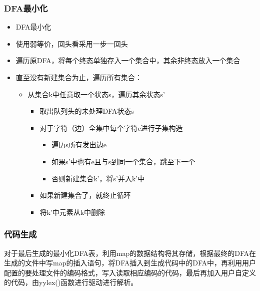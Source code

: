 \subsubsection{DFA最小化}
\begin{itemize}
    \item DFA最小化
    \item 使用弱等价，回头看采用一步一回头
    \item 遍历原DFA，将每个终态单独存入一个集合中，其余非终态放入一个集合
    \item 直至没有新建集合为止，遍历所有集合：
    \begin{itemize}
        \item 从集合k中任意取一个状态s，遍历其余状态s’
        \begin{itemize}
            \item 取出队列头的未处理DFA状态s
            \item 对于字符（边）全集中每个字符c进行子集构造
            \begin{itemize}
                \item 遍历s所有发出边e
                \item 如果s’中也有e且与s到同一个集合，跳至下一个
                \item 否则新建集合k’，将s’并入k’中
            \end{itemize}
            \item 如果新建集合了，就终止循环
            \item 将k’中元素从k中删除
        \end{itemize}
    \end{itemize}
\end{itemize}
\subsubsection{代码生成}
对于最后生成的最小化DFA表，利用map的数据结构将其存储，根据最终的DFA在生成的文件中写map的插入语句，将DFA插入到生成代码中的DFA中，再利用用户配置的要处理文件的编码格式，写入读取相应编码的代码，最后再加入用户自定义的代码，由yylex()函数进行驱动进行解析。